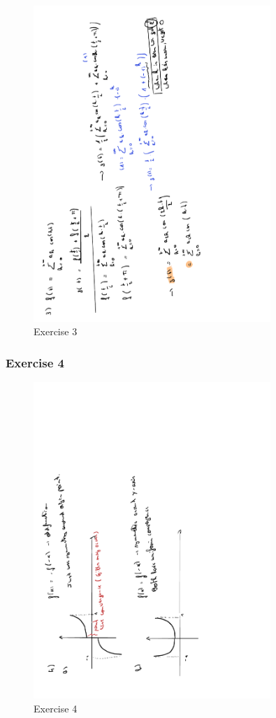 \documentclass[a4paper]{report}
\begin{document}
\begin{figure}[H]
	\centering
	\includegraphics[angle=-90, width=0.8\textwidth]{assets/huis_9_ex_3.pdf}
	\caption{Exercise 3}
\end{figure}

\subsubsection{Exercise 4}

\begin{figure}[H]
	\centering
	\includegraphics[angle=-90, width=0.8\textwidth]{assets/huis_9_ex_4.pdf}
	\caption{Exercise 4}
\end{figure}
\end{document}

